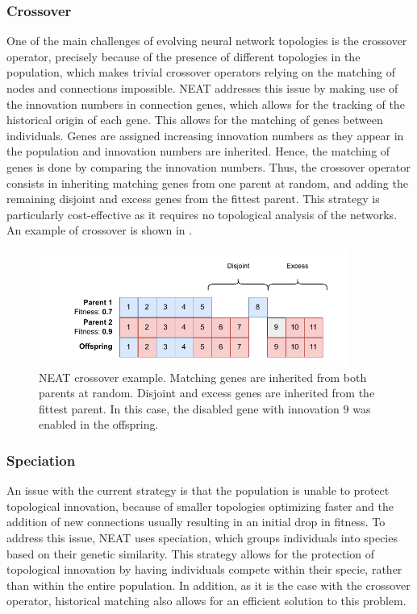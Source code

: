 \subsubsection{Crossover}

One of the main challenges of evolving neural network topologies is the crossover operator, precisely because of the presence of different topologies in the population,
which makes trivial crossover operators relying on the matching of nodes and connections impossible.
NEAT addresses this issue by making use of the innovation numbers in connection genes, which allows for the tracking of the historical origin of each gene. This allows
for the matching of genes between individuals. Genes are assigned increasing innovation numbers as they appear in the population and innovation numbers are inherited.
Hence, the matching of genes is done by comparing the innovation numbers. Thus, the crossover operator consists in inheriting matching genes from one parent at random,
and adding the remaining disjoint and excess genes from the fittest parent. This strategy is particularly cost-effective as it requires no topological analysis of the networks.
An example of crossover is shown in .

\begin{figure}
    \centering
    \includegraphics[width=0.9\textwidth]{Pictures/neat_crossover}
    \caption{NEAT crossover example. Matching genes are inherited from both parents at random. Disjoint and excess genes are inherited from the fittest parent. In this case, the
    disabled gene with innovation $9$ was enabled in the offspring.}
    \label{fig:neat_crossover}
\end{figure}

\subsubsection{Speciation}

An issue with the current strategy is that the population is unable to protect topological innovation, because of smaller topologies optimizing faster and the
addition of new connections usually resulting in an initial drop in fitness. To address this issue, NEAT uses speciation, which groups individuals into species based
on their genetic similarity. This strategy allows for the protection of topological innovation by having individuals compete within their specie, rather than within the
entire population. In addition, as it is the case with the crossover operator, historical matching also allows for an efficient solution to this problem.

